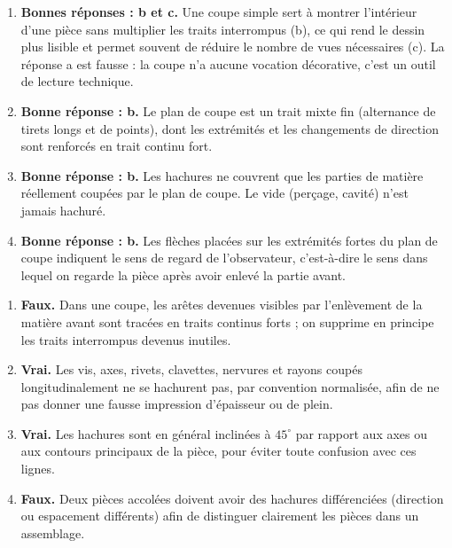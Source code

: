 \documentclass[11pt]{article}
\begin{document}
\begin{corrige}
\begin{enumerate}
\item \textbf{Bonnes réponses : b et c.} Une coupe simple sert à montrer l'intérieur d'une pièce sans multiplier les traits interrompus (b), ce qui rend le dessin plus lisible et permet souvent de réduire le nombre de vues nécessaires (c). La réponse a est fausse : la coupe n'a aucune vocation décorative, c'est un outil de lecture technique.
\item \textbf{Bonne réponse : b.} Le plan de coupe est un trait mixte fin (alternance de tirets longs et de points), dont les extrémités et les changements de direction sont renforcés en trait continu fort.
\item \textbf{Bonne réponse : b.} Les hachures ne couvrent que les parties de matière réellement coupées par le plan de coupe. Le vide (perçage, cavité) n'est jamais hachuré.
\item \textbf{Bonne réponse : b.} Les flèches placées sur les extrémités fortes du plan de coupe indiquent le sens de regard de l'observateur, c'est-à-dire le sens dans lequel on regarde la pièce après avoir enlevé la partie avant.
\end{enumerate}
\end{corrige}

\begin{corrige}
\begin{enumerate}
\item \textbf{Faux.} Dans une coupe, les arêtes devenues visibles par l'enlèvement de la matière avant sont tracées en traits continus forts ; on supprime en principe les traits interrompus devenus inutiles.
\item \textbf{Vrai.} Les vis, axes, rivets, clavettes, nervures et rayons coupés longitudinalement ne se hachurent pas, par convention normalisée, afin de ne pas donner une fausse impression d'épaisseur ou de plein.
\item \textbf{Vrai.} Les hachures sont en général inclinées à $45^{\circ}$ par rapport aux axes ou aux contours principaux de la pièce, pour éviter toute confusion avec ces lignes.
\item \textbf{Faux.} Deux pièces accolées doivent avoir des hachures différenciées (direction ou espacement différents) afin de distinguer clairement les pièces dans un assemblage.
\end{enumerate}
\end{corrige}
\end{document}
